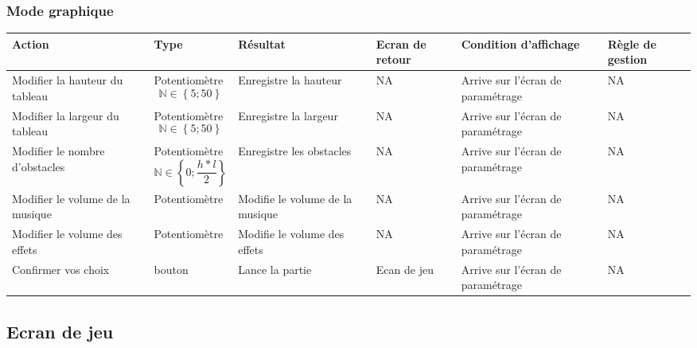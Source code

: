 \documentclass[12pt,a4paper]{article}
\begin{document}
\begin{itemize}
			\subsubsection{Mode graphique}
				\hspace{-3cm}
				\begin{tabular}{|p{2.5cm}|p{2cm}|p{3cm}|p{2.5cm}|p{3cm}|p{3cm}|} %
					\hline
					Action                        & Type                            				       & Résultat              	& Ecran de retour   		& Condition d'affichage 			& Règle de gestion \\
					\hline \hline
					Modifier la hauteur du tableau & Potentiomètre $$\mathbb{N} \in \left\{5;50\right\}$$  & Enregistre la hauteur 	& NA 		& Arrive sur l'écran de paramétrage	& NA\\
					\hline
					Modifier la largeur du tableau & Potentiomètre $$\mathbb{N} \in \left\{5;50\right\}$$  & Enregistre la largeur 	& NA 		& Arrive sur l'écran de paramétrage  & NA\\
					\hline
					Modifier le nombre d'obstacles & Potentiomètre $$\mathbb{N} \in \left\{0;\frac{h*l}{2}\right\}$$  & Enregistre les obstacles  & NA & Arrive sur l'écran de paramétrage & NA\\
					\hline
					Modifier le volume de la musique & Potentiomètre & Modifie le volume de la musique & NA & Arrive sur l'écran de paramétrage & NA\\
					\hline
					Modifier le volume des effets & Potentiomètre & Modifie le volume des effets & NA & Arrive sur l'écran de paramétrage & NA\\
					\hline
					Confirmer vos choix 		  & bouton		  & Lance la partie		& Ecan de jeu				& Arrive sur l'écran de paramétrage	& NA\\
					\hline
				\end{tabular}
				\label{Action possible sur l'écran de paramétrage graphique}

		\subsection{Ecran de jeu}

\end{itemize}
\end{document}
